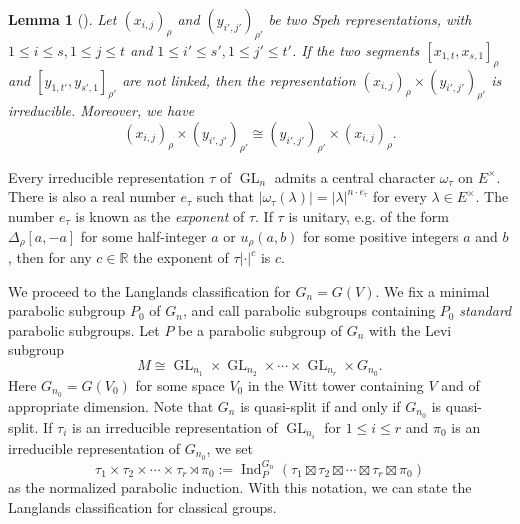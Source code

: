 \documentclass[11pt,letterpaper]{amsart}
\theoremstyle{plain}
\newcounter{theorem}[section]
\numberwithin{theorem}{section}
\numberwithin{equation}{subsection}
\newtheorem{Lem}[theorem]{Lemma}
\theoremstyle{remark}
\newcommand{\GL}{\operatorname{GL}}
\newcommand{\Ind}{\operatorname{Ind}}
\newcommand{\R}{\mathbb{R}}
\begin{document}
\begin{Lem}[{\cite[Thm. 1.1]{MR3224483}}]
Let \(\left(x_{i,j}\right)_{\rho}\) and \(\left(y_{i',j'}\right)_{\rho'}\) be two Speh representations, with \(1\leq i\leq s,1\leq j\leq t\) and \(1\leq i'\leq s',1\leq j'\leq t'\). If the two segments \([x_{1,t},x_{s,1}]_{\rho}\) and \([y_{1,t'},y_{s',1}]_{\rho'}\) are not linked, then the representation \((x_{i,j})_{\rho}\times (y_{i',j'})_{\rho'}\) is irreducible. Moreover, we have
\[
    (x_{i,j})_{\rho}\times (y_{i',j'})_{\rho'}\cong (y_{i',j'})_{\rho'}\times (x_{i,j})_{\rho}.
\]
\end{Lem}

\vskip 5pt

Every irreducible representation \(\tau\) of \(\GL_n\) admits a central character \(\omega_{\tau}\) on \(E^{\times}\). There is also a real number \(e_{\tau}\) such that \(|\omega_{\tau}(\lambda)|=|\lambda|^{n\cdot e_{\tau}}\) for every \(\lambda\in E^{\times}\). The number \(e_{\tau}\) is known as the \emph{exponent} of \(\tau\). If \(\tau\) is unitary, e.g. of the form \(\Delta_{\rho}[a,-a]\) for some half-integer \(a\) or \(u_{\rho}(a,b)\) for some positive integers \(a\) and \(b\), then for any $c\in\R$ the exponent of \(\tau|\cdot|^c\) is \(c\).

\vskip 5pt

We proceed to the Langlands classification for \(G_n= G(V)\). We fix a minimal parabolic subgroup $P_0$ of $G_n$, and call parabolic subgroups containing $P_0$ \emph{standard} parabolic subgroups. Let \(P\) be a parabolic subgroup of $G_n$ with the Levi subgroup
\[
    M \cong \GL_{n_1}\times\GL_{n_2}\times\cdots\times\GL_{n_r}\times G_{n_0}.
\]
Here $G_{n_0}=G(V_0)$ for some space $V_0$ in the Witt tower containing $V$ and of appropriate dimension. Note that \(G_n\) is quasi-split if and only if \(G_{n_0}\) is quasi-split. If \(\tau_i\) is an irreducible representation of \(\GL_{n_i}\) for \(1\leq i\leq r\) and \(\pi_0\) is an irreducible representation of \(G_{n_0}\), we set
\[
    \tau_1\times\tau_2\times\cdots\times\tau_r\rtimes\pi_0:=\Ind^{G_n}_{P}\left(\tau_1\boxtimes\tau_2\boxtimes\cdots\boxtimes\tau_r\boxtimes\pi_0\right)
\]
as the normalized parabolic induction. With this notation, we can state the Langlands classification for classical groups.
\end{document}
